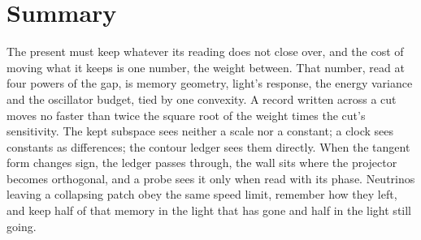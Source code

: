 \documentclass[11pt]{article}
\theoremstyle{definition}
\begin{document}
\section{Summary}

The present must keep whatever its reading does not close over, and the cost of moving what it keeps is one number, the weight between. That number, read at four powers of the gap, is memory geometry, light's response, the energy variance and the oscillator budget, tied by one convexity. A record written across a cut moves no faster than twice the square root of the weight times the cut's sensitivity. The kept subspace sees neither a scale nor a constant; a clock sees constants as differences; the contour ledger sees them directly. When the tangent form changes sign, the ledger passes through, the wall sits where the projector becomes orthogonal, and a probe sees it only when read with its phase. Neutrinos leaving a collapsing patch obey the same speed limit, remember how they left, and keep half of that memory in the light that has gone and half in the light still going.
\end{document}
